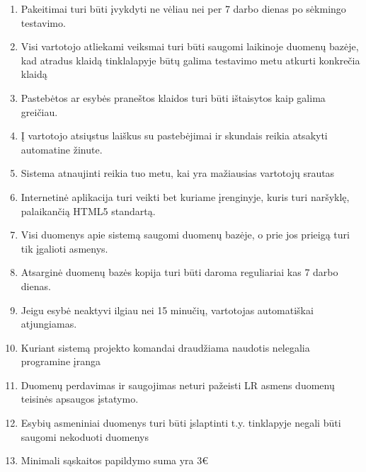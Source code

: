 \documentclass[oneside]{VUMIFPSkursinis}
\begin{document}
\begin{enumerate}
	\item Pakeitimai turi būti įvykdyti ne vėliau nei per 7 darbo dienas po sėkmingo testavimo.
	\item Visi vartotojo atliekami veiksmai turi būti saugomi laikinoje duomenų bazėje, kad atradus klaidą tinklalapyje būtų galima testavimo metu atkurti konkrečia klaidą
	\item Pastebėtos ar esybės praneštos klaidos turi būti ištaisytos kaip galima greičiau.
	\item Į vartotojo atsiųstus laiškus su pastebėjimai ir skundais reikia atsakyti automatine žinute.
	\item Sistema atnaujinti reikia tuo metu, kai yra mažiausias vartotojų srautas
	\item Internetinė aplikacija turi veikti bet kuriame įrenginyje, kuris turi naršyklę, palaikančią HTML5 standartą.
	\item Visi duomenys apie sistemą saugomi duomenų bazėje, o prie jos prieigą turi tik įgalioti asmenys.
	\item Atsarginė duomenų bazės kopija turi būti daroma reguliariai kas 7 darbo dienas.
	\item Jeigu esybė neaktyvi ilgiau nei 15 minučių, vartotojas automatiškai atjungiamas.
	\item Kuriant sistemą projekto komandai draudžiama naudotis nelegalia programine įranga
	\item Duomenų perdavimas ir saugojimas neturi pažeisti LR asmens duomenų teisinės apsaugos įstatymo.
	\item Esybių asmeniniai duomenys turi būti įslaptinti t.y. tinklapyje negali būti saugomi nekoduoti duomenys
	\item Minimali sąskaitos papildymo suma yra 3€

\end{enumerate}
\end{document}
